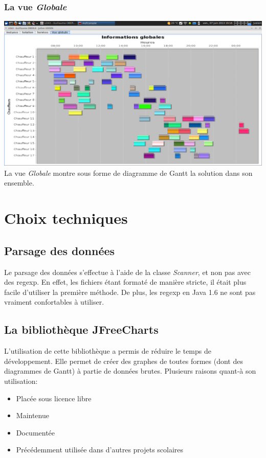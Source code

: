 \documentclass[12pt]{article}
\begin{document}
\subsubsection{La vue \emph{Globale}}
\includegraphics[width=\textwidth]{global.png}
La vue \emph{Globale} montre sous forme de diagramme de Gantt la solution dans son ensemble.

\newpage
\section{Choix techniques}
\subsection{Parsage des données}
Le parsage des données s'effectue à l'aide de la classe \emph{Scanner}, et non pas avec des regexp. En effet, les fichiers étant formaté de manière stricte, il était plus facile d'utiliser la première méthode. De plus, les regexp en Java 1.6 ne sont pas vraiment confortables à utiliser.
\subsection{La bibliothèque JFreeCharts}
L'utilisation de cette bibliothèque a permis de réduire le temps de développement. Elle permet de créer des graphes de toutes formes (dont des diagrammes de Gantt) à partie de données brutes. Plusieurs raisons quant-à son utilisation:
\begin{itemize}
	\item Placée sous licence libre
	\item Maintenue
	\item Documentée
	\item Précédemment utilisée dans d'autres projets scolaires
\end{itemize}
\end{document}

